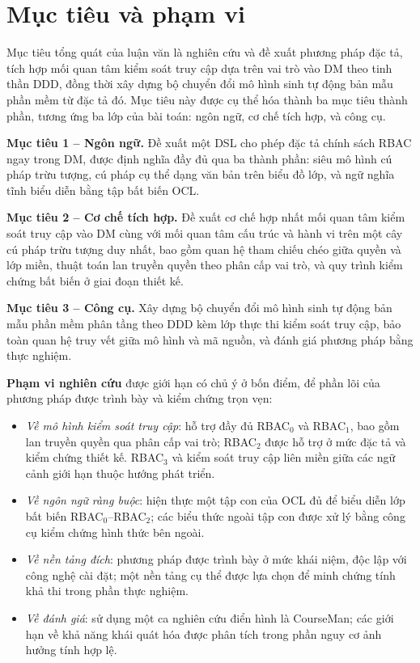 \section{Mục tiêu và phạm vi}
\label{sec:muc-tieu}

Mục tiêu tổng quát của luận văn là nghiên cứu và đề xuất phương pháp đặc tả, tích hợp mối quan tâm kiểm soát truy cập dựa trên vai trò vào DM theo tinh thần DDD, đồng thời xây dựng bộ chuyển đổi mô hình sinh tự động bản mẫu phần mềm từ đặc tả đó. Mục tiêu này được cụ thể hóa thành ba mục tiêu thành phần, tương ứng ba lớp của bài toán: ngôn ngữ, cơ chế tích hợp, và công cụ.

\textbf{Mục tiêu 1 -- Ngôn ngữ.} Đề xuất một DSL cho phép đặc tả chính sách RBAC ngay trong DM, được định nghĩa đầy đủ qua ba thành phần: siêu mô hình cú pháp trừu tượng, cú pháp cụ thể dạng văn bản trên biểu đồ lớp, và ngữ nghĩa tĩnh biểu diễn bằng tập bất biến OCL.

\textbf{Mục tiêu 2 -- Cơ chế tích hợp.} Đề xuất cơ chế hợp nhất mối quan tâm kiểm soát truy cập vào DM cùng với mối quan tâm cấu trúc và hành vi trên một cây cú pháp trừu tượng duy nhất, bao gồm quan hệ tham chiếu chéo giữa quyền và lớp miền, thuật toán lan truyền quyền theo phân cấp vai trò, và quy trình kiểm chứng bất biến ở giai đoạn thiết kế.

\textbf{Mục tiêu 3 -- Công cụ.} Xây dựng bộ chuyển đổi mô hình sinh tự động bản mẫu phần mềm phân tầng theo DDD kèm lớp thực thi kiểm soát truy cập, bảo toàn quan hệ truy vết giữa mô hình và mã nguồn, và đánh giá phương pháp bằng thực nghiệm.

\textbf{Phạm vi nghiên cứu} được giới hạn có chủ ý ở bốn điểm, để phần lõi của phương pháp được trình bày và kiểm chứng trọn vẹn:

\begin{itemize}[leftmargin=1.6em,itemsep=2pt]
  \item \emph{Về mô hình kiểm soát truy cập}: hỗ trợ đầy đủ RBAC$_0$ và RBAC$_1$, bao gồm lan truyền quyền qua phân cấp vai trò; RBAC$_2$ được hỗ trợ ở mức đặc tả và kiểm chứng thiết kế. RBAC$_3$ và kiểm soát truy cập liên miền giữa các ngữ cảnh giới hạn thuộc hướng phát triển.
  \item \emph{Về ngôn ngữ ràng buộc}: hiện thực một tập con của OCL đủ để biểu diễn lớp bất biến RBAC$_0$--RBAC$_2$; các biểu thức ngoài tập con được xử lý bằng công cụ kiểm chứng hình thức bên ngoài.
  \item \emph{Về nền tảng đích}: phương pháp được trình bày ở mức khái niệm, độc lập với công nghệ cài đặt; một nền tảng cụ thể được lựa chọn để minh chứng tính khả thi trong phần thực nghiệm.
  \item \emph{Về đánh giá}: sử dụng một ca nghiên cứu điển hình là CourseMan; các giới hạn về khả năng khái quát hóa được phân tích trong phần nguy cơ ảnh hưởng tính hợp lệ.
\end{itemize}

